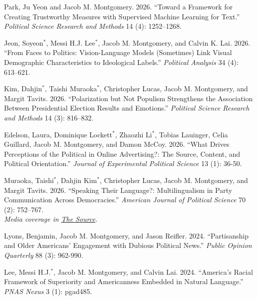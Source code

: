\documentclass[10pt]{article}
\renewenvironment{CV}
  {\begin{list}{}
    {\renewcommand{\makelabel}{\entrylabel}
    \setlength{\labelwidth}{55pt}
    \setlength{\leftmargin}{62pt}
  }}
  {\end{list}}
\newcommand{\cvnote}[1]{\\[0.1em]{\hspace*{0.5em}\small\itshape #1}}
\newcommand{\student}[1]{#1$^{*}$}
\begin{document}
\begin{CV}


  \item[]  Park, Ju Yeon and Jacob M. Montgomery. 2026. ``Toward a Framework for Creating Trustworthy Measures with Supervised Machine Learning for Text.'' \textit{Political Science Research and Methods} 14 (4): 1252--1268.

\item[] \student{Jeon, Soyeon}, \student{Messi H.J. Lee}, Jacob M. Montgomery, and Calvin K. Lai.  2026. ``From Faces to Politics: Vision-Language Models (Sometimes) Link Visual Demographic Characteristics to Ideological Labels.'' \textit{Political Analysis} 34 (4): 613--621.

\item[] \student{Kim, Dahjin}, \student{Taishi Muraoka}, Christopher Lucas, Jacob M. Montgomery, and Margit Tavits. 2026. ``Polarization but Not Populism Strengthens the Association Between Presidential Election Results and Emotions.'' \textit{Political Science Research and Methods} 14 (3): 816--832.

  \item[]  Edelson, Laura, \student{Dominique Lockett}, \student{Zhaozhi Li}, Tobias Lauinger, Celia Guillard, Jacob M. Montgomery, and Damon McCoy. 2026. ``What Drives Perceptions of the Political in Online Advertising?: The Source, Content, and Political Orientation.'' \textit{Journal of Experimental Political Science} 13 (1): 36-50.
  

 \item[]  \student{Muraoka, Taishi}, \student{Dahjin Kim},
   Christopher Lucas, Jacob M. Montgomery, and Margit Tavits. 2026. ``Speaking Their Language?: Multilingualism in Party Communication Across Democracies.'' \textit{American Journal of Political Science} 70 (2): 752–767.
\cvnote{Media coverage in \href{https://source.washu.edu/2026/05/study-reveals-how-when-political-parties-communicate-with-citizens-in-multiple-languages/}{The Source}.}
 

 \item[] Lyons, Benjamin, Jacob M. Montgomery, and Jason Reifler. 2024. ``Partisanship and Older Americans' Engagement with
     Dubious Political News.''  \textit{Public Opinion Quarterly} 88 (3): 962-990.

 \item[] \student{Lee, Messi H.J.}, Jacob M. Montgomery, and Calvin
   Lai. 2024. ``America's Racial Framework of Superiority and Americanness
    Embedded in Natural Language.'' \emph{PNAS Nexus} 3 (1): pgad485.


\end{CV}
\end{document}
